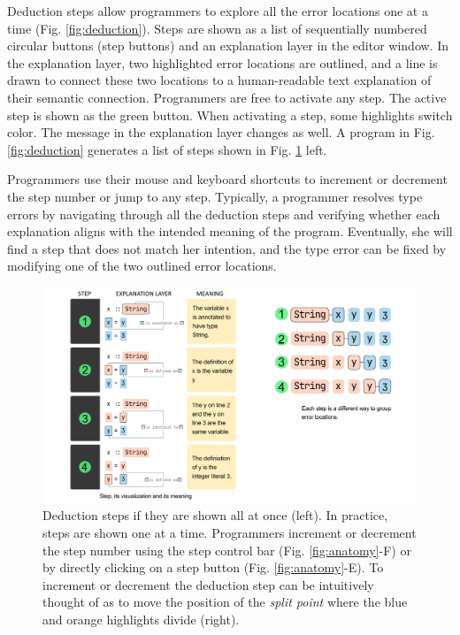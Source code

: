 Deduction steps allow programmers to explore all the error locations one at a time (Fig. \ref{fig:deduction}). Steps are shown as a list of sequentially  numbered circular buttons (step buttons) and an explanation layer in the editor window. In the explanation layer, two highlighted error locations are outlined, and a line is drawn to connect these two locations to a human-readable text explanation of
their semantic connection. Programmers are free to activate any step. The active step is shown as the green button. When activating a step, some highlights switch color. The message in the explanation layer changes as well. A program in Fig. \ref{fig:deduction} generates a list of steps shown in Fig. \ref{fig:step-interface} left.

Programmers use their mouse and keyboard shortcuts to increment or decrement the step number or jump to any step. Typically, a programmer resolves  type errors by navigating through all the deduction steps and verifying whether each explanation aligns with the intended meaning of the program. Eventually, she will find a step that does not match her intention, and the type error can be fixed by modifying one of the two outlined error locations.


\begin{figure}[h]
    \centering
    \includegraphics[width=\linewidth]{images/step-interface.pdf}
    \caption{
Deduction steps if they are shown all at once (left). In practice, steps are shown one at a time. Programmers increment or decrement the step number using the step control bar (Fig. \ref{fig:anatomy}-F) or by directly clicking on a step button (Fig. \ref{fig:anatomy}-E). To increment or decrement the deduction step can be intuitively thought of as to move the position of the \textit{split point} where the blue and orange highlights divide (right).
        }
    \label{fig:step-interface}
\end{figure}

